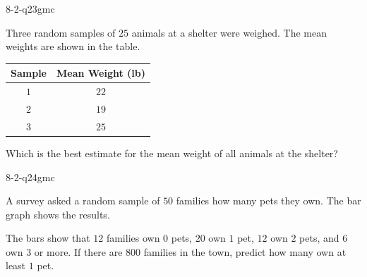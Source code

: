 \begin{practiceQuestion}{8-2-q23}{gmc}
\begin{questionText}
Three random samples of $25$ animals at a shelter were weighed. The mean weights are shown in the table.

\begin{center}
\begin{tabular}{|c|c|}
\hline
\textbf{Sample} & \textbf{Mean Weight (lb)} \\
\hline
$1$ & $22$ \\
$2$ & $19$ \\
$3$ & $25$ \\
\hline
\end{tabular}
\end{center}

Which is the best estimate for the mean weight of all animals at the shelter?
\end{questionText}
\end{practiceQuestion}

\begin{practiceQuestion}{8-2-q24}{gmc}
\begin{questionText}
A survey asked a random sample of $50$ families how many pets they own. The bar graph shows the results.

\begin{center}
\end{center}

The bars show that $12$ families own $0$ pets, $20$ own $1$ pet, $12$ own $2$ pets, and $6$ own $3$ or more. If there are $800$ families in the town, predict how many own at least $1$ pet.
\end{questionText}
\end{practiceQuestion}

